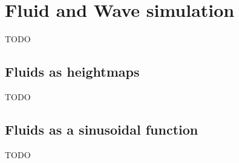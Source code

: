 \documentclass[a4paper]{article}
\begin{document}
\section{Fluid and Wave simulation}
\label{sec:fluid_dynamics}

TODO

\subsection{Fluids as heightmaps}

TODO

\subsection{Fluids as a sinusoidal function}

TODO
\end{document}
